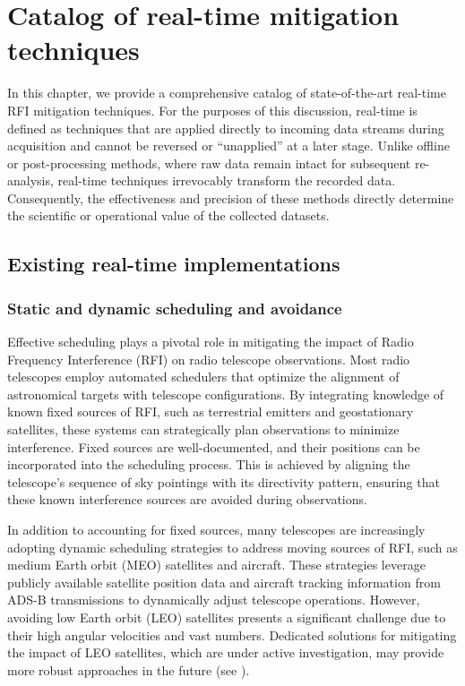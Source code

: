 \section{Catalog of real-time mitigation techniques}
\label{section:hardware:catalog}

In this chapter, we provide a comprehensive catalog of state-of-the-art real-time RFI mitigation techniques. For the purposes of this discussion, real-time is defined as techniques that are applied directly to incoming data streams during acquisition and cannot be reversed or ``unapplied'' at a later stage. Unlike offline or post-processing methods, where raw data remain intact for subsequent re-analysis, real-time techniques irrevocably transform the recorded data. Consequently, the effectiveness and precision of these methods directly determine the scientific or operational value of the collected datasets.

\subsection{Existing real-time implementations}
\label{subsection:hardware:catalog:existing}
\subsubsection{Static and dynamic scheduling and avoidance}
Effective scheduling plays a pivotal role in mitigating the impact of Radio Frequency Interference (RFI) on radio telescope observations. Most radio telescopes employ automated schedulers that optimize the alignment of astronomical targets with telescope configurations. By integrating knowledge of known fixed sources of RFI, such as terrestrial emitters and geostationary satellites, these systems can strategically plan observations to minimize interference. Fixed sources are well-documented, and their positions can be incorporated into the scheduling process. This is achieved by aligning the telescope's sequence of sky pointings with its directivity pattern, ensuring that these known interference sources are avoided during observations.

In addition to accounting for fixed sources, many telescopes are increasingly adopting dynamic scheduling strategies to address moving sources of RFI, such as medium Earth orbit (MEO) satellites and aircraft. These strategies leverage publicly available satellite position data and aircraft tracking information from ADS-B transmissions to dynamically adjust telescope operations. However, avoiding low Earth orbit (LEO) satellites presents a significant challenge due to their high angular velocities and vast numbers. Dedicated solutions for mitigating the impact of LEO satellites, which are under active investigation, may provide more robust approaches in the future (see \cite{subsubsec:avoidance}).

